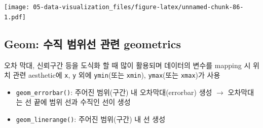 \documentclass[
  11pt,
]{krantz}
\newenvironment{Shaded}{\begin{snugshade}}{\end{snugshade}}
\newcommand{\CommentTok}[1]{\textcolor[rgb]{0.37,0.37,0.37}{\textit{#1}}}
\newcommand{\DataTypeTok}[1]{\textcolor[rgb]{0.27,0.27,0.27}{#1}}
\newcommand{\KeywordTok}[1]{\textcolor[rgb]{0.27,0.27,0.27}{\textbf{#1}}}
\newcommand{\NormalTok}[1]{#1}
\newcommand{\OperatorTok}[1]{\textcolor[rgb]{0.43,0.43,0.43}{\textbf{#1}}}
\newcommand{\StringTok}[1]{\textcolor[rgb]{0.5,0.5,0.5}{#1}}
\providecommand{\tightlist}{%
  \setlength{\itemsep}{0pt}\setlength{\parskip}{0pt}}
\begin{document}
\begin{Shaded}
\end{Shaded}

\normalsize

\footnotesize

\texttt{[image: 05-data-visualization\_files/figure-latex/unnamed-chunk-86-1.pdf]}

\normalsize

\hypertarget{geom-intervals}{%
\subsection{Geom: 수직 범위선 관련 geometrics}\label{geom-intervals}}

오차 막대, 신뢰구간 등을 도식화 할 때 많이 활용되며 데이터의 변수를 mapping 시 위치 관련 aesthetic에 \texttt{x}, \texttt{y} 외에 \texttt{ymin}(또는 \texttt{xmin}), \texttt{ymax}(또는 \texttt{xmax})가 사용

\begin{itemize}
\tightlist
\item
  \texttt{geom\_errorbar()}: 주어진 범위(구간) 내 오차막대(errorbar) 생성 \(\rightarrow\) 오차막대는 선 끝에 범위 선과 수직인 선이 생성
\item
  \texttt{geom\_linerange()}: 주어진 범위(구간) 내 선 생성
\end{itemize}
\end{document}

